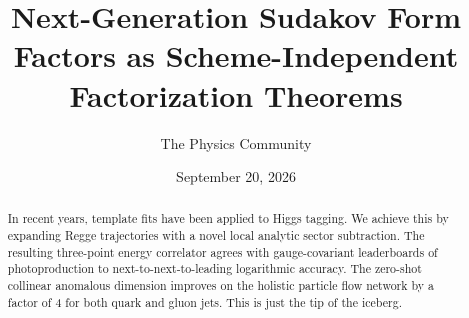 \documentclass[11pt]{article}
\title{Next-Generation Sudakov Form Factors as Scheme-Independent Factorization Theorems}
\author{The Physics Community}
\date{September 20, 2026}
\numberwithin{equation}{section}
\theoremstyle{definition}
\theoremstyle{remark}
\begin{document}
\maketitle
\begin{abstract}
In recent years, template fits have been applied to Higgs tagging. We
achieve this by expanding Regge trajectories with a novel local analytic
sector subtraction. The resulting three-point energy correlator agrees
with gauge-covariant leaderboards of photoproduction to
next-to-next-to-leading logarithmic accuracy. The zero-shot collinear
anomalous dimension improves on the holistic particle flow network by a
factor of 4 for both quark and gluon jets. This is just the tip of the
iceberg.
\end{abstract}
\tableofcontents




\nocite{*}


\end{document}
